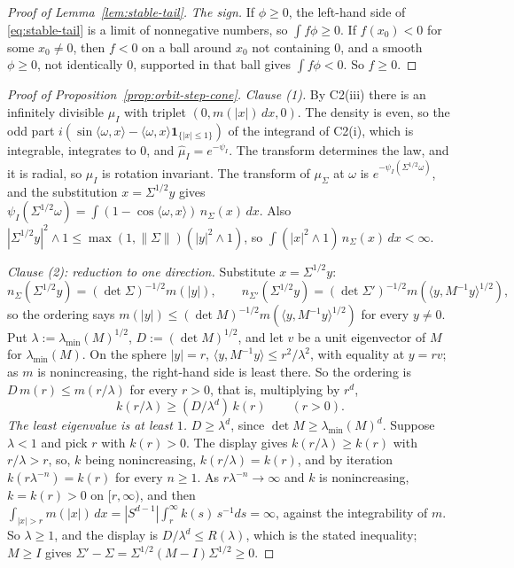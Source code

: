 \begin{proof}[Proof of Lemma~\ref{lem:stable-tail}]
\emph{The sign.} If $\phi \ge 0$, the left-hand side of \ref{eq:stable-tail} is a limit of
nonnegative numbers, so $\int f\phi \ge 0$. If $f(x_0) < 0$ for some $x_0 \ne 0$, then $f < 0$ on a
ball around $x_0$ not containing $0$, and a smooth $\phi \ge 0$, not identically $0$, supported in
that ball gives $\int f\phi < 0$. So $f \ge 0$.
\end{proof}

\begin{proof}[Proof of Proposition~\ref{prop:orbit-step-cone}]
\emph{Clause (1).} By C2(iii) there is an infinitely divisible $\mu_I$ with triplet
$(0, m(|x|)\,dx, 0)$. The density is even, so the odd part
$i(\sin\langle\omega,x\rangle - \langle\omega,x\rangle\mathbf 1_{\{|x| \le 1\}})$ of the integrand of
C2(i), which is integrable, integrates to $0$, and $\widehat\mu_I = e^{-\psi_I}$. The transform
determines the law, and it is radial, so $\mu_I$ is rotation invariant. The transform of $\mu_\Sigma$ at $\omega$ is
$e^{-\psi_I(\Sigma^{1/2}\omega)}$, and the substitution $x = \Sigma^{1/2}y$ gives
$\psi_I(\Sigma^{1/2}\omega) = \int(1 - \cos\langle\omega,x\rangle)\,n_\Sigma(x)\,dx$. Also
$|\Sigma^{1/2}y|^2 \wedge 1 \le \max(1, \|\Sigma\|)(|y|^2 \wedge 1)$, so
$\int(|x|^2 \wedge 1)\,n_\Sigma(x)\,dx < \infty$.

\emph{Clause (2): reduction to one direction.} Substitute $x = \Sigma^{1/2}y$:
\[
  n_\Sigma(\Sigma^{1/2}y) = (\det\Sigma)^{-1/2}m(|y|) , \qquad
  n_{\Sigma'}(\Sigma^{1/2}y) = (\det\Sigma')^{-1/2}m(\langle y,M^{-1}y\rangle^{1/2}) ,
\]
so the ordering says $m(|y|) \le (\det M)^{-1/2}m(\langle y,M^{-1}y\rangle^{1/2})$ for every $y \ne 0$. Put
$\lambda := \lambda_{\min}(M)^{1/2}$, $D := (\det M)^{1/2}$, and let $v$ be a unit eigenvector of $M$ for
$\lambda_{\min}(M)$. On the sphere $|y| = r$, $\langle y,M^{-1}y\rangle \le r^2/\lambda^2$, with equality at
$y = rv$; as $m$ is nonincreasing, the right-hand side is least there. So the ordering is
$D\,m(r) \le m(r/\lambda)$ for every $r > 0$, that is, multiplying by $r^d$,
\[
  k(r/\lambda) \ge (D/\lambda^d)\,k(r) \qquad (r > 0).
\]
\emph{The least eigenvalue is at least $1$.} $D \ge \lambda^d$, since $\det M \ge \lambda_{\min}(M)^d$.
Suppose $\lambda < 1$ and pick $r$ with $k(r) > 0$. The display gives $k(r/\lambda) \ge k(r)$ with
$r/\lambda > r$, so, $k$ being nonincreasing, $k(r/\lambda) = k(r)$, and by iteration
$k(r\lambda^{-n}) = k(r)$ for every $n \ge 1$. As $r\lambda^{-n} \to \infty$ and $k$ is nonincreasing,
$k = k(r) > 0$ on $[r,\infty)$, and then $\int_{|x| > r}m(|x|)\,dx = |S^{d-1}|\int_r^\infty k(s)\,s^{-1}ds
= \infty$, against the integrability of $m$. So $\lambda \ge 1$, and the display is
$D/\lambda^d \le R(\lambda)$, which is the stated inequality; $M \ge I$ gives
$\Sigma' - \Sigma = \Sigma^{1/2}(M - I)\Sigma^{1/2} \ge 0$.


\end{proof}
